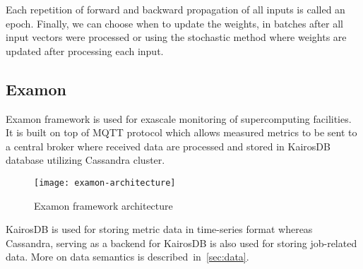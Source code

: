 Each repetition of forward and backward propagation of all inputs is called an epoch. Finally, we can choose when to update the weights, in batches after all input vectors were processed or using the stochastic method where weights are updated after processing each input.

\subsection{Examon}
\label{sec:examon}
Examon\cite{examon} framework is used for exascale monitoring of supercomputing facilities. It is built on top of MQTT protocol\cite{locke2010mqtt} which allows measured metrics to be sent to a central broker where received data are processed and stored in KairosDB\cite{KAIROS} database utilizing Cassandra\cite{CASSANDRA} cluster.

\begin{figure}[ht]
    \centering
    \texttt{[image: examon-architecture]}
    \caption{Examon framework architecture}
    \label{arch}
\end{figure}

KairosDB is used for storing metric data in time-series format whereas Cassandra, serving as a backend for KairosDB is also used for storing job-related data. More on data semantics is described~in~\ref{sec:data}.

